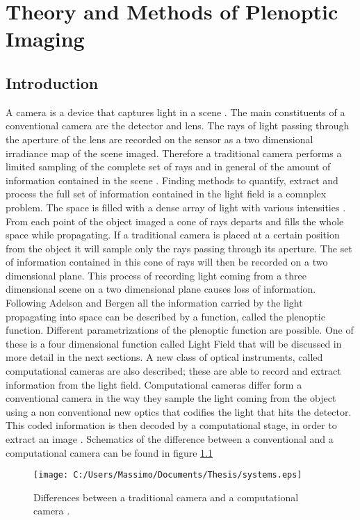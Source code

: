 \chapter{Theory and Methods of Plenoptic Imaging}
\label{chap:chapter1}
\section{Introduction}
\label{sec:intro1}
A camera is a device that captures light in a scene \cite{zhou2011computational}. The main constituents of a conventional camera are the detector and lens. The rays of light passing through the aperture of the lens are recorded on the sensor as a two dimensional irradiance map of the scene imaged. Therefore a traditional camera performs a limited sampling of the complete set of rays and in general of the amount of information contained in the scene \cite{nayar2006computational}. Finding methods to quantify, extract and process the full set of information contained in the light field is a comnplex problem. The space is filled with a dense array of light with various intensities \cite{adelson1991plenoptic}. From each point of the object imaged a cone of rays departs and fills the whole space while propagating. If a traditional camera is placed at a certain position from the object it will sample only the rays passing through its aperture. The set of information contained in this cone of rays will then be recorded on a two dimensional plane. This process of recording light coming from a three dimensional scene on a two dimensional plane causes loss of information. Following Adelson and Bergen \cite{adelson1991plenoptic} all the information carried by the light propagating into space can be described by a function, called the plenoptic function. Different parametrizations of the plenoptic function are possible. One of these is a four dimensional function called Light Field that will be discussed in more detail in the next sections. A new class of optical instruments, called computational cameras are also described; these are able to record and extract information from the light field. Computational cameras differ form a conventional camera in the way they sample the light coming from the object using a non conventional new optics that codifies the light that hits the detector. This coded information is then decoded by a computational stage, in order to extract an image \cite{nayar2006computational}. Schematics of the difference between a conventional and a computational camera can be found in figure \ref{fig:systems}
\begin{figure}[H]
	\centering
	\texttt{[image: C:/Users/Massimo/Documents/Thesis/systems.eps]}
	\caption{\label{fig:systems}Differences between a traditional camera and a computational camera \cite{nayar2006computational}.}
\end{figure}
